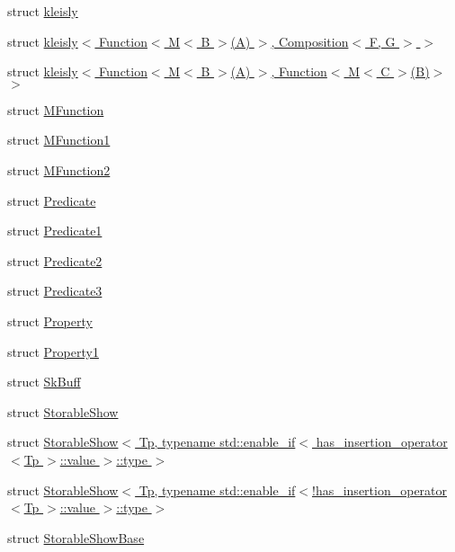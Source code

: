 \begin{DoxyCompactItemize}
struct \hyperlink{structpfq_1_1lang_1_1kleisly}{kleisly}
\item 
struct \hyperlink{structpfq_1_1lang_1_1kleisly_3_01Function_3_01M_3_01B_01_4_07A_08_01_4_00_01Composition_3_01F_00_01G_01_4_01_4}{kleisly$<$ Function$<$ M$<$ B $>$(\+A) $>$, Composition$<$ F, G $>$ $>$}
\item 
struct \hyperlink{structpfq_1_1lang_1_1kleisly_3_01Function_3_01M_3_01B_01_4_07A_08_01_4_00_01Function_3_01M_3_01C_01_4_07B_08_4_01_4}{kleisly$<$ Function$<$ M$<$ B $>$(\+A) $>$, Function$<$ M$<$ C $>$(\+B)$>$ $>$}
\item 
struct \hyperlink{structpfq_1_1lang_1_1MFunction}{M\+Function}
\item 
struct \hyperlink{structpfq_1_1lang_1_1MFunction1}{M\+Function1}
\item 
struct \hyperlink{structpfq_1_1lang_1_1MFunction2}{M\+Function2}
\item 
struct \hyperlink{structpfq_1_1lang_1_1Predicate}{Predicate}
\item 
struct \hyperlink{structpfq_1_1lang_1_1Predicate1}{Predicate1}
\item 
struct \hyperlink{structpfq_1_1lang_1_1Predicate2}{Predicate2}
\item 
struct \hyperlink{structpfq_1_1lang_1_1Predicate3}{Predicate3}
\item 
struct \hyperlink{structpfq_1_1lang_1_1Property}{Property}
\item 
struct \hyperlink{structpfq_1_1lang_1_1Property1}{Property1}
\item 
struct \hyperlink{structpfq_1_1lang_1_1SkBuff}{Sk\+Buff}
\item 
struct \hyperlink{structpfq_1_1lang_1_1StorableShow}{Storable\+Show}
\item 
struct \hyperlink{structpfq_1_1lang_1_1StorableShow_3_01Tp_00_01typename_01std_1_1enable__if_3_01has__insertion__od122cff4f7f007817c88f5b20f967bec}{Storable\+Show$<$ Tp, typename std\+::enable\+\_\+if$<$ has\+\_\+insertion\+\_\+operator$<$\+Tp $>$\+::value $>$\+::type $>$}
\item 
struct \hyperlink{structpfq_1_1lang_1_1StorableShow_3_01Tp_00_01typename_01std_1_1enable__if_3_9has__insertion__op9c58e317fa180887b2f1b929c60377c7}{Storable\+Show$<$ Tp, typename std\+::enable\+\_\+if$<$!has\+\_\+insertion\+\_\+operator$<$\+Tp $>$\+::value $>$\+::type $>$}
\item 
struct \hyperlink{structpfq_1_1lang_1_1StorableShowBase}{Storable\+Show\+Base}
\end{DoxyCompactItemize}
